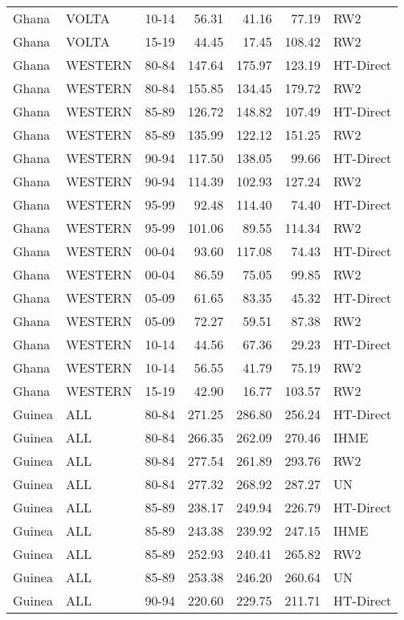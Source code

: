 \begin{longtable}{lllrrrl}
  Ghana & VOLTA & 10-14 & 56.31 & 41.16 & 77.19 & RW2 \\ 
  Ghana & VOLTA & 15-19 & 44.45 & 17.45 & 108.42 & RW2 \\ 
  Ghana & WESTERN & 80-84 & 147.64 & 175.97 & 123.19 & HT-Direct \\ 
  Ghana & WESTERN & 80-84 & 155.85 & 134.45 & 179.72 & RW2 \\ 
  Ghana & WESTERN & 85-89 & 126.72 & 148.82 & 107.49 & HT-Direct \\ 
  Ghana & WESTERN & 85-89 & 135.99 & 122.12 & 151.25 & RW2 \\ 
  Ghana & WESTERN & 90-94 & 117.50 & 138.05 & 99.66 & HT-Direct \\ 
  Ghana & WESTERN & 90-94 & 114.39 & 102.93 & 127.24 & RW2 \\ 
  Ghana & WESTERN & 95-99 & 92.48 & 114.40 & 74.40 & HT-Direct \\ 
  Ghana & WESTERN & 95-99 & 101.06 & 89.55 & 114.34 & RW2 \\ 
  Ghana & WESTERN & 00-04 & 93.60 & 117.08 & 74.43 & HT-Direct \\ 
  Ghana & WESTERN & 00-04 & 86.59 & 75.05 & 99.85 & RW2 \\ 
  Ghana & WESTERN & 05-09 & 61.65 & 83.35 & 45.32 & HT-Direct \\ 
  Ghana & WESTERN & 05-09 & 72.27 & 59.51 & 87.38 & RW2 \\ 
  Ghana & WESTERN & 10-14 & 44.56 & 67.36 & 29.23 & HT-Direct \\ 
  Ghana & WESTERN & 10-14 & 56.55 & 41.79 & 75.19 & RW2 \\ 
  Ghana & WESTERN & 15-19 & 42.90 & 16.77 & 103.57 & RW2 \\ 
  Guinea & ALL & 80-84 & 271.25 & 286.80 & 256.24 & HT-Direct \\ 
  Guinea & ALL & 80-84 & 266.35 & 262.09 & 270.46 & IHME \\ 
  Guinea & ALL & 80-84 & 277.54 & 261.89 & 293.76 & RW2 \\ 
  Guinea & ALL & 80-84 & 277.32 & 268.92 & 287.27 & UN \\ 
  Guinea & ALL & 85-89 & 238.17 & 249.94 & 226.79 & HT-Direct \\ 
  Guinea & ALL & 85-89 & 243.38 & 239.92 & 247.15 & IHME \\ 
  Guinea & ALL & 85-89 & 252.93 & 240.41 & 265.82 & RW2 \\ 
  Guinea & ALL & 85-89 & 253.38 & 246.20 & 260.64 & UN \\ 
  Guinea & ALL & 90-94 & 220.60 & 229.75 & 211.71 & HT-Direct \\ 

\end{longtable}
